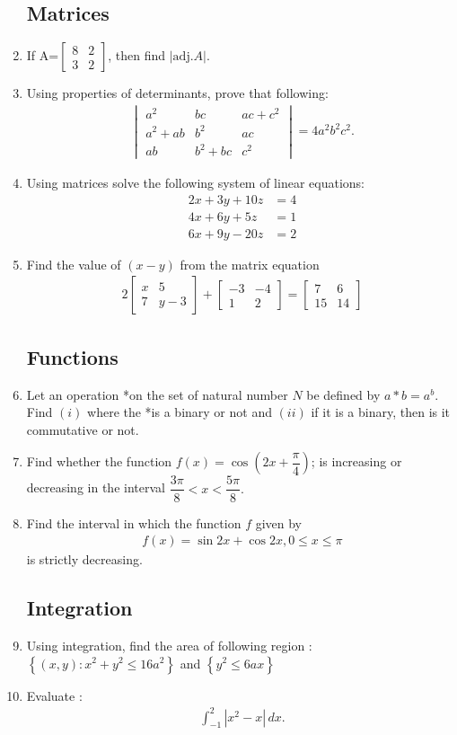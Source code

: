 \documentclass[12pt,-letter paper]{article}
\providecommand{\mydet}[1]{\ensuremath{\begin{vmatrix}#1\end{vmatrix}}}
\providecommand{\myvec}[1]{\ensuremath{\begin{bmatrix}#1\end{bmatrix}}}
\providecommand{\cbrak}[1]{\ensuremath{\left\{#1\right\}}}
\providecommand{\brak}[1]{\ensuremath{\left(#1\right)}}
\providecommand{\abs}[1]{\left\vert#1\right\vert}
\begin{document}
\begin{enumerate}
\subsection*{ Matrices}
\item If A=$\myvec{8&2\\3&2}$, then find $\abs{\text{adj}
.A}$.
\item Using properties of determinants, prove that following:
\begin{align*}
\mydet{a^2&bc&ac+c^2\\a^2+ab&b^2&ac\\ab&b^2+bc&c^2}=4a^2b^2c^2.
\end{align*}                                                   
\item Using matrices solve the following system of linear equations:
	\begin{align*}
		    2x+3y+10z&=4\\4x+6y+5z&=1\\6x+9y-20z&=2
	\end{align*}       
\item Find the value of $\brak{x-y}$ from the matrix equation 
	\begin{align*}
		2\myvec{x & 5\\7 & y-3}+\myvec{-3 & -4\\1 & 2}=\myvec{7 & 6\\15 & 14}
	\end{align*}
\subsection*{Functions}
\item Let an operation *on the set of natural number $N$ be defined by $a*b=a^b$. Find $\brak{i}$ where the *is a binary or not and $\brak{ii}$ if it is a binary, then is it commutative or not. 
\item Find whether the function $f\brak{x}=\cos\brak{2x+\dfrac{\pi}{4}}$; is increasing or decreasing in the interval $\dfrac{3\pi}{8}<x<\dfrac{5\pi}{8}.$  

\item Find the interval in which the function $f$ given by \begin{align*}
f\brak{x}=\sin2x+\cos2x, 0\leq x\leq \pi \end{align*} is strictly decreasing. 

\subsection*{Integration}                                               
\item Using  integration, find the area of following region :$\cbrak{\brak{x,y}:x^2+y^2\leq16a^2}$ and $\cbrak{y^2\leq6ax}$
\item Evaluate :
\begin{align*}
\int_{-1}^{2}|x^2-x|\, dx.
\end{align*}  
                                             

\end{enumerate}
\end{document}
